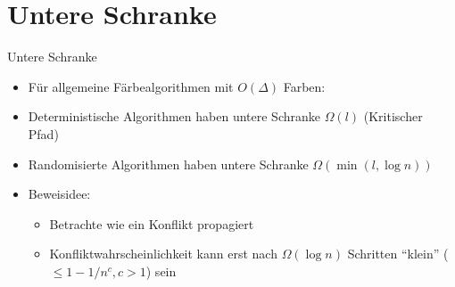 \documentclass[18pt]{beamer}
\begin{document}
\section{Untere Schranke}
\begin{frame}{Untere Schranke}
	\begin{itemize}[<+->]
		\item Für allgemeine Färbealgorithmen mit $O(\Delta)$ Farben:
		\item Deterministische Algorithmen haben untere Schranke $\Omega(l)$ (Kritischer Pfad)
		\item Randomisierte Algorithmen haben untere Schranke $\Omega(\min(l, \log n))$
		\item Beweisidee:
		\begin{itemize}
			\item Betrachte wie ein Konflikt propagiert
			\item<9> Konfliktwahrscheinlichkeit kann erst nach $\Omega(\log n)$ Schritten "`klein"' ($\leq 1-1/n^c, c>1$) sein
		\end{itemize}
	\end{itemize}
\end{frame}
\end{document}
